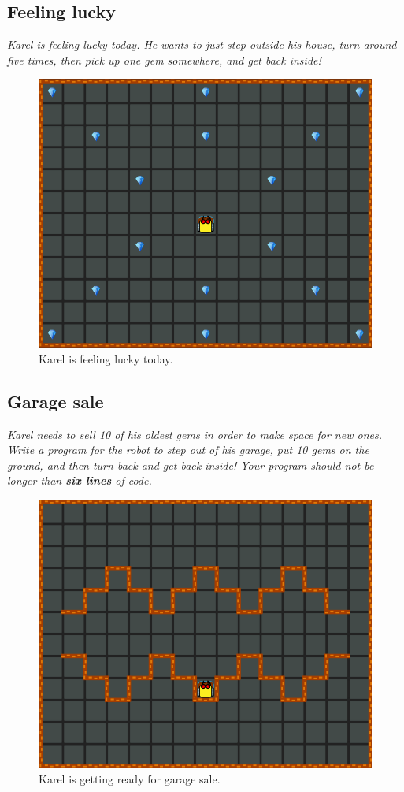 {{\subsection{Feeling lucky}

{\em Karel is feeling lucky today. He wants to just step outside his house, 
turn around five times, then pick up one gem somewhere, and get back inside!}


\begin{figure}[!ht]
\begin{center}
\includegraphics[height=0.4\textwidth]{img/c03.png}
\end{center}
\vspace{-4mm}
\caption{Karel is feeling lucky today.}
\label{fig:c03}
\vspace{-4mm}
\end{figure}
\noindent



\subsection{Garage sale}

{\em Karel needs to sell 10 of his oldest gems in order to make space for new ones. 
Write a program for the robot to step out of his garage, put 10 gems on the ground, 
and then turn back and get back inside! Your program should not be longer than {\bf six lines} of code.}


\begin{figure}[!ht]
\begin{center}
\includegraphics[height=0.4\textwidth]{img/c04.png}
\end{center}
\vspace{-4mm}
\caption{Karel is getting ready for garage sale.}
\label{fig:c04}
\vspace{-10mm}
\end{figure}



}}
